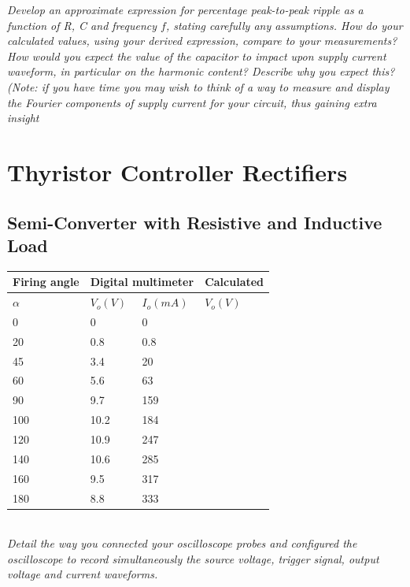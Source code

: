 \documentclass[12pt,a4paper]{article}
\begin{document}
\textit{Develop an approximate expression for percentage peak-to-peak ripple as a function of R, C and
frequency $f$, stating carefully any assumptions. How do your calculated values, using your derived
expression, compare to your measurements?}\\

\textit{How would you expect the value of the capacitor to impact upon supply current waveform, in
particular on the harmonic content? Describe why you expect this?
(Note: if you have time you may wish to think of a way to measure and display the Fourier
components of supply current for your circuit, thus gaining extra insight}\\
\section{Thyristor Controller Rectifiers}
\subsection{Semi-Converter with Resistive and Inductive Load}
\begin{center}
\begin{tabular}{|p{3cm}|p{2.5cm}|p{2.5cm}|p{2.5cm}|}
\hline
\centering\textbf{Firing angle} &
\multicolumn{2}{c|}{\textbf{Digital multimeter}} &
\centering\textbf{Calculated} \tabularnewline
\hline
\centering$\alpha$ & \centering$V_o(V)$ & \centering$I_o(mA)$ & \centering$V_o(V)$ \tabularnewline
\hline
0 & 0 & 0 & \\ \hline
20 & 0.8 & 0.8 & \\ \hline
45 & 3.4 & 20 & \\ \hline
60 & 5.6 & 63 & \\ \hline
90 & 9.7 & 159 & \\ \hline
100 & 10.2 & 184 & \\ \hline
120 & 10.9 & 247 & \\ \hline
140 & 10.6 & 285 & \\ \hline
160 & 9.5 & 317 & \\ \hline
180 & 8.8 & 333 & \\ \hline
\end{tabular}
\end{center}\\
\textit{Detail the way you connected your oscilloscope probes and configured the oscilloscope to record simultaneously the source voltage, trigger signal, output voltage and current waveforms.}\\
\end{document}
